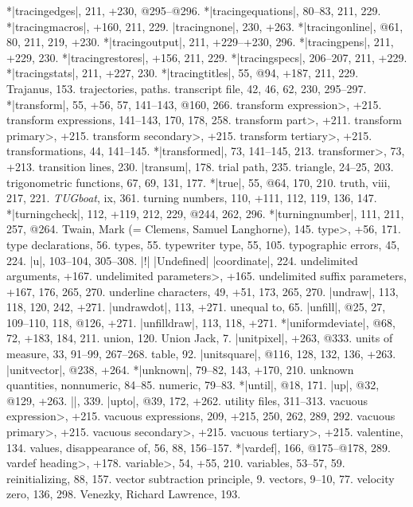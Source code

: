 *|tracingedges|, 211, +230, @295--@296.
*|tracingequations|, 80--83, 211, 229.
*|tracingmacros|, +160, 211, 229.
|tracingnone|, 230, +263.
*|tracingonline|, @61, 80, 211, 219, +230.
*|tracingoutput|, 211, +229--+230, 296.
*|tracingpens|, 211, +229, 230.
*|tracingrestores|, +156, 211, 229.
*|tracingspecs|, 206--207, 211, +229.
*|tracingstats|, 211, +227, 230.
*|tracingtitles|, 55, @94, +187, 211, 229.
Trajanus, 153.
trajectories, \see paths.
transcript file, 42, 46, 62, 230, 295--297.
*|transform|, 55, +56, 57, 141--143, @160, 266.
\<transform expression>, +215.
transform expressions, 141--143, 170, 178, 258.
\<transform part>, +211.
\<transform primary>, +215.
\<transform secondary>, +215.
\<transform tertiary>, +215.
transformations, 44, 141--145.
*|transformed|, 73, 141--145, 213.
\<transformer>, 73, +213.
transition lines, 230.
|transum|, 178.
trial path, 235.
triangle, 24--25, 203.
trigonometric functions, 67, 69, 131, 177.
*|true|, 55, @64, 170, 210.
truth, viii, 217, 221.
{\sl TUGboat}, ix, 361.
turning numbers, 110, +111, 112, 119, 136, 147.
*|turningcheck|, 112, +119, 212, 229, @244, 262, 296.
*|turningnumber|, 111, 211, 257, @264.
Twain, Mark (= Clemens, Samuel Langhorne), 145.
\<type>, +56, 171.
type declarations, 56.
types, 55.
typewriter type, 55, 105.
typographic errors, 45, 224.
\newletter
|u|, 103--104, 305--308.
|!| |Undefined| |coordinate|, 224.
undelimited arguments, +167.
\<undelimited parameters>, +165.
undelimited suffix parameters, +167, 176, 265, 270.
underline characters, 49, +51, 173, 265, 270.
|undraw|, 113, 118, 120, 242, +271.
|undrawdot|, 113, +271.
unequal to, 65.
|unfill|, @25, 27, 109--110, 118, @126, +271.
|unfilldraw|, 113, 118, +271.
*|uniformdeviate|, @68, 72, +183, 184, 211.
union, 120.
Union Jack, 7.
|unitpixel|, +263, @333.
units of measure, 33, 91--99, 267--268.
\sub table, 92.
|unitsquare|, @116, 128, 132, 136, +263.
|unitvector|, @238, +264.
*|unknown|, 79--82, 143, +170, 210.
unknown quantities, nonnumeric, 84--85.
\sub numeric, 79--83.
*|until|, @18, 171.
|up|, @32, @129, +263.
|\uppers|, 339.
|upto|, @39, 172, +262.
utility files, 311--313.
\newletter
\<vacuous expression>, +215.
vacuous expressions, 209, +215, 250, 262, 289, 292.
\<vacuous primary>, +215.
\<vacuous secondary>, +215.
\<vacuous tertiary>, +215.
valentine, 134.
values, disappearance of, 56, 88, 156--157.
*|vardef|, 166, @175--@178, 289.
\<vardef heading>, +178.
\<variable>, 54, +55, 210.
variables, 53--57, 59.
\sub reinitializing, 88, 157.
vector subtraction principle, 9.
vectors, 9--10, 77.
velocity zero, 136, 298.
Venezky, Richard Lawrence, 193.
